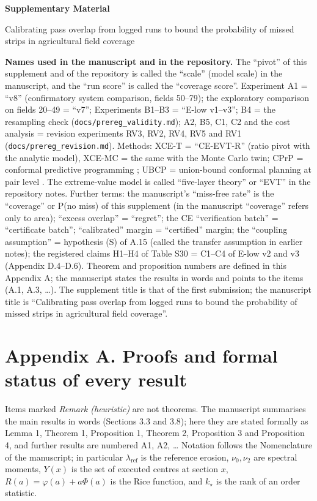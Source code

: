 \documentclass[preprint,12pt,authoryear]{elsarticle}
\begin{document}
\begin{center}
{\Large\bfseries Supplementary Material\par}\vspace{0.6em}
{\large Calibrating pass overlap from logged runs to bound the probability of missed strips in agricultural field coverage\par}
\end{center}
\tableofcontents
\bigskip
\textbf{Names used in the manuscript and in the repository.} The ``pivot'' of this supplement and of the repository is called the ``scale'' (model scale) in the manuscript, and the ``run score'' is called the ``coverage score''. Experiment A1 = ``v8'' (confirmatory system comparison, fields 50--79); the exploratory comparison on fields 20--49 = ``v7''; Experiments B1--B3 = ``E-low v1--v3''; B4 = the resampling check (\texttt{docs/prereg\_validity.md}); A2, B5, C1, C2 and the cost analysis = revision experiments RV3, RV2, RV4, RV5 and RV1 (\texttt{docs/prereg\_revision.md}). Methods: XCE-T = ``CE-EVT-R'' (ratio pivot with the analytic model), XCE-MC = the same with the Monte Carlo twin; CPrP = conformal predictive programming \citep{zhao2024}; UBCP = union-bound conformal planning at pair level \citep{lindemann2023}. The extreme-value model is called ``five-layer theory'' or ``EVT'' in the repository notes. Further terms: the manuscript's ``miss-free rate'' is the ``coverage'' or P(no miss) of this supplement (in the manuscript ``coverage'' refers only to area); ``excess overlap'' = ``regret''; the CE ``verification batch'' = ``certificate batch''; ``calibrated'' margin = ``certified'' margin; the ``coupling assumption'' = hypothesis (S) of A.15 (called the transfer assumption in earlier notes); the registered claims H1--H4 of Table S30 = C1--C4 of E-low v2 and v3 (Appendix D.4--D.6). Theorem and proposition numbers are defined in this Appendix A; the manuscript states the results in words and points to the items (A.1, A.3, \ldots). The supplement title is that of the first submission; the manuscript title is ``Calibrating pass overlap from logged runs to bound the probability of missed strips in agricultural field coverage''.

\section*{Appendix A. Proofs and formal status of every result}

Items marked \emph{Remark (heuristic)} are not theorems. The manuscript summarises the main results in words (Sections 3.3 and 3.8); here they are stated formally as Lemma 1, Theorem 1, Proposition 1, Theorem 2, Proposition 3 and Proposition 4, and further results are numbered A1, A2, \ldots{} Notation follows the Nomenclature of the manuscript; in particular \(\lambda_\mathrm{ref}\) is the reference erosion, \(\nu_0,\nu_2\) are spectral moments, \(Y(x)\) is the set of executed centres at section \(x\), \(R(a)=\varphi(a)+a\Phi(a)\) is the Rice function, and \(k_\star\) is the rank of an order statistic.
\end{document}
